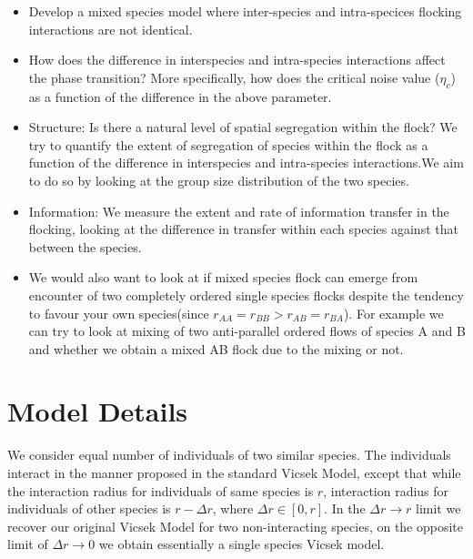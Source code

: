 \documentclass[12pt,a4paper]{article}
\begin{document}
\begin{itemize}
\item Develop a mixed species model where inter-species and intra-specices flocking interactions are not identical. 

\item How does the difference in interspecies and intra-species interactions affect the phase transition? More specifically, how does the critical noise value ($\eta_{c}$) as a function of the difference in the above parameter. 

\item Structure: Is there a natural level of spatial segregation within the 
flock? We try to quantify the extent of segregation of species within the flock as a function of the difference in interspecies and intra-species interactions.We aim to do so by looking at the group size distribution of the two species.%

\item Information: We measure the extent and rate of information transfer in the flocking, looking at the difference in transfer within each species against that between the species.
\item We would also want to look at if mixed species flock can emerge from encounter of two completely ordered single species flocks despite the tendency to favour your own species(since $r_{AA}=r_{BB}>r_{AB}=r_{BA}$). For example we can try to look at mixing of two anti-parallel ordered flows of species A and B and whether we obtain a mixed AB flock due to the mixing or not.  
\end{itemize}

\section*{Model Details}
We consider equal number of individuals of two similar species. The individuals interact in the manner proposed in the standard Vicsek Model, except that while the interaction radius for individuals of same species is $r$, interaction radius for individuals of other species is $ r -\Delta r $, where $\Delta r \in [0,r]$. In the $\Delta r\rightarrow r$ limit we recover our original Vicsek Model for two non-interacting species, on the opposite limit of $\Delta r \rightarrow 0$ we obtain essentially a single species Vicsek model.
\end{document}
